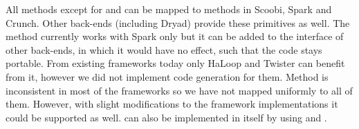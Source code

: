 All methods except for  and  can be mapped to methods in Scoobi, Spark and Crunch. Other back-ends (including Dryad) provide these primitives as well. The  method currently works with Spark only but it can be added to the interface of other back-ends, in which it would have no effect, such that the code stays portable. From existing frameworks today only HaLoop\cite{bu_haloop:_2010} and Twister \cite{ekanayake_twister:_2010} can benefit from it, however we did not implement code generation for them. Method  is inconsistent in most of the frameworks so we have not mapped uniformly to all of them. However, with slight modifications to the framework implementations it could be supported as well.  can also be implemented in \tool itself by using  and .
